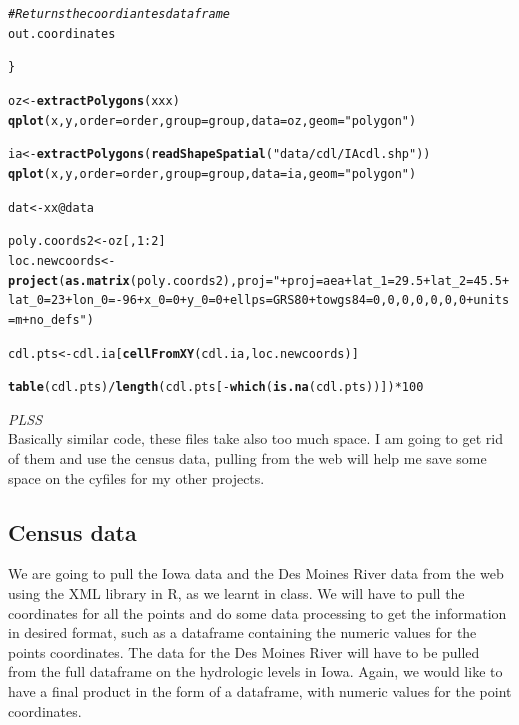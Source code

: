 \documentclass{article}\usepackage[]{graphicx}\usepackage[]{color}
\makeatletter
\newcommand{\hlnum}[1]{\textcolor[rgb]{0.686,0.059,0.569}{#1}}%
\newcommand{\hlstr}[1]{\textcolor[rgb]{0.192,0.494,0.8}{#1}}%
\newcommand{\hlcom}[1]{\textcolor[rgb]{0.678,0.584,0.686}{\textit{#1}}}%
\newcommand{\hlopt}[1]{\textcolor[rgb]{0,0,0}{#1}}%
\newcommand{\hlstd}[1]{\textcolor[rgb]{0.345,0.345,0.345}{#1}}%
\newcommand{\hlkwb}[1]{\textcolor[rgb]{0.69,0.353,0.396}{#1}}%
\newcommand{\hlkwc}[1]{\textcolor[rgb]{0.333,0.667,0.333}{#1}}%
\newcommand{\hlkwd}[1]{\textcolor[rgb]{0.737,0.353,0.396}{\textbf{#1}}}%
\newenvironment{kframe}{%
 \def\at@end@of@kframe{}%
 \ifinner\ifhmode%
  \def\at@end@of@kframe{\end{minipage}}%
  \begin{minipage}{\columnwidth}%
 \fi\fi%
 \def\FrameCommand##1{\hskip\@totalleftmargin \hskip-\fboxsep
 \colorbox{shadecolor}{##1}\hskip-\fboxsep
     \hskip-\linewidth \hskip-\@totalleftmargin \hskip\columnwidth}%
 \MakeFramed {\advance\hsize-\width
   \@totalleftmargin\z@ \linewidth\hsize
   \@setminipage}}%
 {\par\unskip\endMakeFramed%
 \at@end@of@kframe}
\newenvironment{knitrout}{}{} %
\makeatother
\begin{document}
\begin{itemize}
\begin{knitrout}
\begin{kframe}
\begin{alltt}
    \hlcom{# Returns the coordiantes data frame}
    \hlstd{out.coordinates}

\hlstd{\}}

\hlstd{oz} \hlkwb{<-} \hlkwd{extractPolygons}\hlstd{(xxx)}
\hlkwd{qplot}\hlstd{(x, y,} \hlkwc{order} \hlstd{= order,} \hlkwc{group} \hlstd{= group,} \hlkwc{data} \hlstd{= oz,} \hlkwc{geom} \hlstd{=} \hlstr{"polygon"}\hlstd{)}

\hlstd{ia} \hlkwb{<-} \hlkwd{extractPolygons}\hlstd{(}\hlkwd{readShapeSpatial}\hlstd{(}\hlstr{"data/cdl/IAcdl.shp"}\hlstd{))}
\hlkwd{qplot}\hlstd{(x, y,} \hlkwc{order} \hlstd{= order,} \hlkwc{group} \hlstd{= group,} \hlkwc{data} \hlstd{= ia,} \hlkwc{geom} \hlstd{=} \hlstr{"polygon"}\hlstd{)}

\hlstd{dat} \hlkwb{<-} \hlstd{xx}\hlopt{@}\hlkwc{data}


\hlstd{poly.coords2} \hlkwb{<-} \hlstd{oz[,} \hlnum{1}\hlopt{:}\hlnum{2}\hlstd{]}
\hlstd{loc.newcoords} \hlkwb{<-} \hlkwd{project}\hlstd{(}\hlkwd{as.matrix}\hlstd{(poly.coords2),} \hlkwc{proj} \hlstd{=} \hlstr{"+proj=aea +lat_1=29.5 +lat_2=45.5 +lat_0=23 +lon_0=-96 +x_0=0 +y_0=0 +ellps=GRS80 +towgs84=0,0,0,0,0,0,0 +units=m +no_defs"}\hlstd{)}

\hlstd{cdl.pts} \hlkwb{<-} \hlstd{cdl.ia[}\hlkwd{cellFromXY}\hlstd{(cdl.ia, loc.newcoords)]}


\hlkwd{table}\hlstd{(cdl.pts)}\hlopt{/}\hlkwd{length}\hlstd{(cdl.pts[}\hlopt{-}\hlkwd{which}\hlstd{(}\hlkwd{is.na}\hlstd{(cdl.pts))])} \hlopt{*} \hlnum{100}
\end{alltt}
\end{kframe}
\end{knitrout}




\textit{PLSS}\\
Basically similar code, these files take also too much space. I am going to get rid of them and use the census data, pulling from the web will help me save some space on the cyfiles for my other projects. \\


\subsection{Census data}

We are going to pull the Iowa data and the Des Moines River data from the web using the XML library in R, as we learnt in class. We will have to pull the coordinates for all the points and do some data processing to get the information in desired format, such as a dataframe containing the numeric values for the points coordinates. The data for the Des Moines River will have to be pulled from the full dataframe on the hydrologic levels in Iowa. Again, we would like to have a final product in the form of a dataframe, with numeric values for the point coordinates.\\



\end{itemize}
\end{document}
